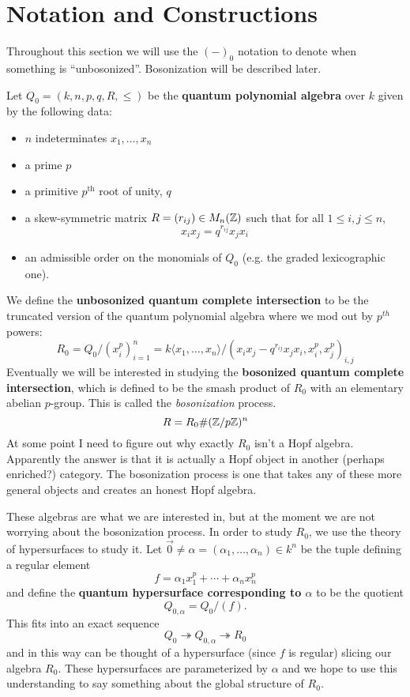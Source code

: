 \documentclass[12pt]{article}
\begin{document}
\section{Notation and Constructions}
Throughout this section we will use the $(-)_0$ notation to denote when something is ``unbosonized''. Bosonization will be described later. 

Let $Q_0=(k, n, p, q, R, \le)$ be the \textbf{quantum polynomial algebra} over $k$ given by the following data:
\begin{itemize}
    \item $n$ indeterminates $x_1,\dots, x_n$
    \item a prime $p$
    \item a primitive $p^\text{th}$ root of unity, $q$
    \item a skew-symmetric matrix $R=(r_{ij})\in M_n(\mathbb{Z})$ such that for all $1\le i,j\le n$,
    \[x_ix_j=q^{r_{ij}}x_jx_i\]
    \item an admissible order on the monomials of $Q_0$ (e.g. the graded lexicographic one).
\end{itemize}

We define the \textbf{unbosonized quantum complete intersection} to be the truncated version of the quantum polynomial algebra where we mod out by $p^{th}$ powers:
\[R_0 = Q_0/(x_i^p)_{i=1}^n=k\langle x_1,\dots,x_n\rangle/(x_ix_j-q^{r_{ij}}x_jx_i, x_i^p, x_j^p)_{i,j}\]
Eventually we will be interested in studying the \textbf{bosonized quantum complete intersection}, which is defined to be the smash product of $R_0$ with an elementary abelian $p$-group. This is called the \textit{bosonization} process.
\[R = R_0 \# (\mathbb{Z}/p\mathbb{Z})^n\]
{\color{red}At some point I need to figure out why exactly $R_0$ isn't a Hopf algebra. Apparently the answer is that it is actually a Hopf object in another (perhaps enriched?) category. The bosonization process is one that takes any of these more general objects and creates an honest Hopf algebra.}

These algebras are what we are interested in, but at the moment we are not worrying about the bosonization process. In order to study $R_0$, we use the theory of hypersurfaces to study it. Let $\vec{0}\ne\alpha=(\alpha_1,\dots,\alpha_n)\in k^n$ be the tuple defining a regular element
\[f = \alpha_1x_1^p+\cdots+\alpha_nx_n^p\]
and define the \textbf{quantum hypersurface corresponding to $\alpha$} to be the quotient
\[Q_{0,\alpha}=Q_0/(f).\]
This fits into an exact sequence
\[
    Q_0\twoheadrightarrow Q_{0,\alpha} \twoheadrightarrow R_0\label{eq:hypersurface} \tag{HS}
\]
and in this way can be thought of a hypersurface (since $f$ is regular) slicing our algebra $R_0$. These hypersurfaces are parameterized by $\alpha$ and we hope to use this understanding to say something about the global structure of $R_0$.
\end{document}
